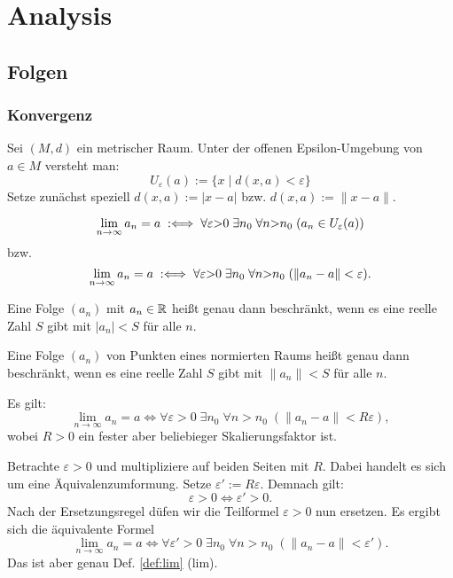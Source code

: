 
\chapter{Analysis}
\section{Folgen}
\subsection{Konvergenz}

\begin{Definition}
Sei $(M,d)$ ein metrischer Raum. Unter der offenen Epsilon-Umgebung
von $a\in M$ versteht man:%
\[U_\varepsilon(a) := \{x\mid d(x,a)<\varepsilon\}\]
Setze zunächst speziell $d(x,a):=|x-a|$ bzw. $d(x,a):=\|x-a\|$.
\end{Definition}

\begin{Definition}\label{def:lim}
\[\lim_{n\to\infty} a_n = a
\;:\Longleftrightarrow\; \forall\varepsilon{>}0\;\exists n_0\;\forall n{>}n_0\;(a_n\in U_\varepsilon(a))\]
bzw.
\[\lim_{n\to\infty} a_n = a
\;:\Longleftrightarrow\; \forall\varepsilon{>}0\;\exists n_0\;\forall n{>}n_0\;(\|a_n-a\|<\varepsilon).\]
\end{Definition}

\begin{Definition}\label{def:bseq}
Eine Folge $(a_n)$ mit $a_n\in\mathbb R$ heißt genau dann beschränkt,
wenn es eine reelle Zahl $S$ gibt mit $|a_n|<S$ für alle $n$.

Eine Folge $(a_n)$ von Punkten eines normierten Raums heißt genau
dann beschränkt, wenn es eine reelle Zahl $S$ gibt mit $\|a_n\|<S$
für alle $n$.
\end{Definition}

\begin{Satz}\label{lim-scaled-ep}
Es gilt:
\[\lim_{n\to\infty} a_n=a \iff
\forall\varepsilon{>}0\;\exists n_0\;\forall n{>}n_0\;(\|a_n-a\|<R\varepsilon),\]
wobei $R>0$ ein fester aber beliebieger Skalierungsfaktor ist.
\end{Satz}

\begin{Beweis}
Betrachte $\varepsilon>0$ und multipliziere auf beiden Seiten
mit $R$. Dabei handelt es sich um eine Äquivalenzumformung.
Setze $\varepsilon':=R\varepsilon$. Demnach gilt:
\[\varepsilon>0 \iff \varepsilon'>0.\]
Nach der Ersetzungsregel düfen wir die Teilformel $\varepsilon>0$
nun ersetzen. Es ergibt sich die äquivalente Formel
\[\lim_{n\to\infty} a_n=a \iff
\forall\varepsilon'{>}0\;\exists n_0\;\forall n{>}n_0\;(\|a_n-a\|<\varepsilon').\]
Das ist aber genau Def. \ref{def:lim} (lim).\,\qedsymbol
\end{Beweis}

